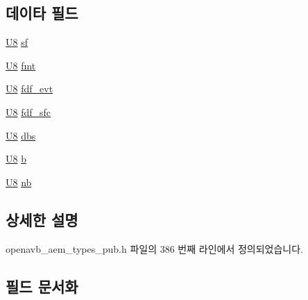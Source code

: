 \subsection*{데이타 필드}
\begin{DoxyCompactItemize}
\item 
\hyperlink{openavb__types__base__pub_8h_aa63ef7b996d5487ce35a5a66601f3e73}{U8} \hyperlink{structopenavb__aem__stream__format__iec__61883__6__float__t_a153db177c2b7653917dff143e5f755e1}{sf}
\item 
\hyperlink{openavb__types__base__pub_8h_aa63ef7b996d5487ce35a5a66601f3e73}{U8} \hyperlink{structopenavb__aem__stream__format__iec__61883__6__float__t_ab88030d1822b822615cede2168f1c31e}{fmt}
\item 
\hyperlink{openavb__types__base__pub_8h_aa63ef7b996d5487ce35a5a66601f3e73}{U8} \hyperlink{structopenavb__aem__stream__format__iec__61883__6__float__t_a5face0fe6e253b8041386eaa28f73800}{fdf\+\_\+evt}
\item 
\hyperlink{openavb__types__base__pub_8h_aa63ef7b996d5487ce35a5a66601f3e73}{U8} \hyperlink{structopenavb__aem__stream__format__iec__61883__6__float__t_a637053a40379dcc42801b92779cd870e}{fdf\+\_\+sfc}
\item 
\hyperlink{openavb__types__base__pub_8h_aa63ef7b996d5487ce35a5a66601f3e73}{U8} \hyperlink{structopenavb__aem__stream__format__iec__61883__6__float__t_abed3ffe3c3261fb920ef333f76a290bd}{dbs}
\item 
\hyperlink{openavb__types__base__pub_8h_aa63ef7b996d5487ce35a5a66601f3e73}{U8} \hyperlink{structopenavb__aem__stream__format__iec__61883__6__float__t_a8921ab436782828cd4262390e8b01eb7}{b}
\item 
\hyperlink{openavb__types__base__pub_8h_aa63ef7b996d5487ce35a5a66601f3e73}{U8} \hyperlink{structopenavb__aem__stream__format__iec__61883__6__float__t_a023f12d5e389074b0205b2ff18a0db54}{nb}
\end{DoxyCompactItemize}


\subsection{상세한 설명}


openavb\+\_\+aem\+\_\+types\+\_\+pub.\+h 파일의 386 번째 라인에서 정의되었습니다.



\subsection{필드 문서화}
